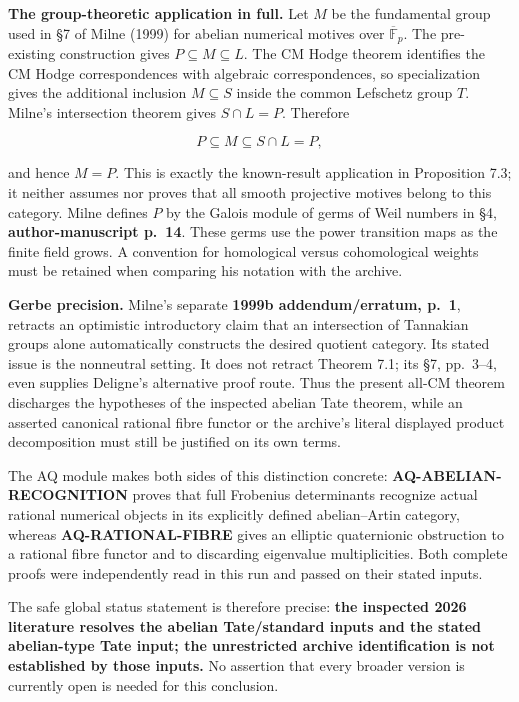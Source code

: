 \textbf{The group-theoretic application in full.} Let \(M\) be the
fundamental group used in §7 of Milne (1999) for abelian numerical
motives over \(\overline{\mathbb F}_p\). The pre-existing construction
gives \(P\subseteq M\subseteq L\). The CM Hodge theorem identifies the
CM Hodge correspondences with algebraic correspondences, so
specialization gives the additional inclusion \(M\subseteq S\) inside
the common Lefschetz group \(T\). Milne's intersection theorem gives
\(S\cap L=P\). Therefore

\[
P\subseteq M\subseteq S\cap L=P,
\]

and hence \(M=P\). This is exactly the known-result application in
Proposition 7.3; it neither assumes nor proves that all smooth
projective motives belong to this category. Milne defines \(P\) by the
Galois module of germs of Weil numbers in §4, \textbf{author-manuscript
p.~14}. These germs use the power transition maps as the finite field
grows. A convention for homological versus cohomological weights must be
retained when comparing his notation with the archive.

\textbf{Gerbe precision.} Milne's separate \textbf{1999b
addendum/erratum, p.~1}, retracts an optimistic introductory claim that
an intersection of Tannakian groups alone automatically constructs the
desired quotient category. Its stated issue is the nonneutral setting.
It does not retract Theorem 7.1; its §7, pp.~3--4, even supplies
Deligne's alternative proof route. Thus the present all-CM theorem
discharges the hypotheses of the inspected abelian Tate theorem, while
an asserted canonical rational fibre functor or the archive's literal
displayed product decomposition must still be justified on its own
terms.

The AQ module makes both sides of this distinction concrete:
\textbf{AQ-ABELIAN-RECOGNITION} proves that full Frobenius determinants
recognize actual rational numerical objects in its explicitly defined
abelian--Artin category, whereas \textbf{AQ-RATIONAL-FIBRE} gives an
elliptic quaternionic obstruction to a rational fibre functor and to
discarding eigenvalue multiplicities. Both complete proofs were
independently read in this run and passed on their stated inputs.

The safe global status statement is therefore precise: \textbf{the
inspected 2026 literature resolves the abelian Tate/standard inputs and
the stated abelian-type Tate input; the unrestricted archive
identification is not established by those inputs.} No assertion that
every broader version is currently open is needed for this conclusion.

